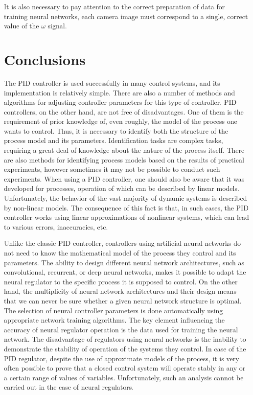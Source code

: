 \documentclass[conference]{IEEEtran}
\begin{document}
It is also necessary to pay attention to the correct preparation of data for training neural networks, each camera image must correspond to a single, correct value of the $\omega$ signal.


\section{Conclusions}\label{sec:conclusion}
The PID controller is used successfully in many control systems, and its implementation is relatively simple. There are also a number of methods and algorithms for adjusting controller parameters for this type of controller. PID controllers, on the other hand, are not free of disadvantages. One of them is the requirement of prior knowledge of, even roughly, the model of the process one wants to control. Thus, it is necessary to identify both the structure of the process model and its parameters. Identification tasks are complex tasks, requiring a great deal of knowledge about the nature of the process itself. There are also methods for identifying process models based on the results of practical experiments, however sometimes it may not be possible to conduct such experiments. When using a PID controller, one should also be aware that it was developed for processes, operation of which can be described by linear models. Unfortunately, the behavior of the vast majority of dynamic systems is described by non-linear models. The consequence of this fact is that, in such cases, the PID controller works using linear approximations of nonlinear systems, which can lead to various errors, inaccuracies, etc.

Unlike the classic PID controller, controllers using artificial neural networks do not need to know the mathematical model of the process they control and its parameters. The ability to design different neural network architectures, such as convolutional, recurrent, or deep neural networks, makes it possible to adapt the neural regulator to the specific process it is supposed to control. On the other hand, the multiplicity of neural network architectures and their design means that we can never be sure whether a given neural network structure is optimal.
The selection of neural controller parameters is done automatically using appropriate network training algorithms.  The key element influencing the accuracy of neural regulator operation is the data used for training the neural network. The disadvantage of regulators using neural networks is the inability to demonstrate the stability of operation of the systems they control. In case of the PID regulator, despite the use of approximate models of the process, it is very often possible to prove that a closed control system will operate stably in any or a certain range of values of variables. Unfortunately, such an analysis cannot be carried out in the case of neural regulators. 
\end{document}
